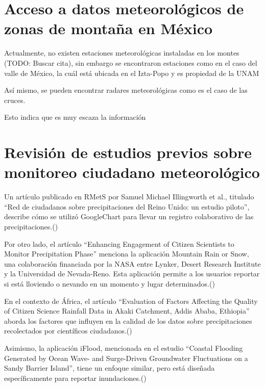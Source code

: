 \section{Acceso a datos meteorológicos de zonas de montaña en México}

Actualmente, no existen estaciones meteorológicas instaladas en los montes (TODO: Buscar cita), sin embargo se encontraron estaciones como en el caso del valle de México, la cuál está ubicada en el Izta-Popo y es propiedad de la UNAM

Así mismo, se pueden encontrar radares meteorológicas como es el caso de las cruces. 

Esto indica que es muy escaza la información
















\section{Revisión de estudios previos sobre monitoreo ciudadano meteorológico}

Un artículo publicado en RMetS por Samuel Michael Illingworth et al., titulado “Red de ciudadanos sobre precipitaciones del Reino Unido: un estudio piloto”, describe cómo se utilizó GoogleChart para llevar un registro colaborativo de las precipitaciones.(\cite{illingworth2021ukprecipitation}) 

Por otro lado, el artículo “Enhancing Engagement of Citizen Scientists to Monitor Precipitation Phase” menciona la aplicación Mountain Rain or Snow, una colaboración financiada por la NASA entre Lynker, Desert Research Institute y la Universidad de Nevada-Reno. Esta aplicación permite a los usuarios reportar si está lloviendo o nevando en un momento y lugar determinados.(\cite{lute2021enhancing})


En el contexto de África, el artículo “Evaluation of Factors Affecting the Quality of Citizen Science Rainfall Data in Akaki Catchment, Addis Ababa, Ethiopia” aborda los factores que influyen en la calidad de los datos sobre precipitaciones recolectados por científicos ciudadanos.(\cite{tedla2022evaluation}) 

Asimismo, la aplicación iFlood, mencionada en el estudio “Coastal Flooding Generated by Ocean Wave- and Surge-Driven Groundwater Fluctuations on a Sandy Barrier Island”, tiene un enfoque similar, pero está diseñada específicamente para reportar inundaciones.(\cite{elgar2021coastal}) 



